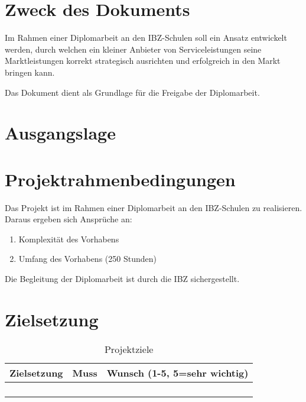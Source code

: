 
\section{Zweck des Dokuments}
\label{sec:orgccc22f9}

Im Rahmen einer Diplomarbeit an den IBZ-Schulen soll ein Ansatz
entwickelt werden, durch welchen ein kleiner Anbieter von
Serviceleistungen seine Marktleistungen korrekt strategisch ausrichten
und erfolgreich in den Markt bringen kann.

Das Dokument dient als Grundlage für die Freigabe der Diplomarbeit.

\section{Ausgangslage}
\label{sec:org57c9c5b}

\section{Projektrahmenbedingungen}
\label{sec:orgf9f1ee2}

Das Projekt ist im Rahmen einer Diplomarbeit an den IBZ-Schulen zu
realisieren. Daraus ergeben sich Ansprüche an:

\begin{enumerate}
\item Komplexität des Vorhabens
\item Umfang des Vorhabens (250 Stunden)
\end{enumerate}

Die Begleitung der Diplomarbeit ist durch die IBZ sichergestellt.

\section{Zielsetzung}
\label{sec:orgef138bc}

\begin{table}[htbp]
\centering
\begin{tabular}{|p{9cm}|p{1.5cm}|p{2cm}|}
\hline
\textbf{Zielsetzung}\cellcolor[HTML]{C0C0C0} & \textbf{Muss}\cellcolor[HTML]{C0C0C0} & \textbf{Wunsch} (1-5, 5=sehr wichtig)\cellcolor[HTML]{C0C0C0}\\
\hline
 &  & \\
\hline
 &  & \\
\hline
 &  & \\
\hline
 &  & \\
\hline
\end{tabular}
\caption{\label{tab:org74fa125}
Projektziele}

\end{table}

